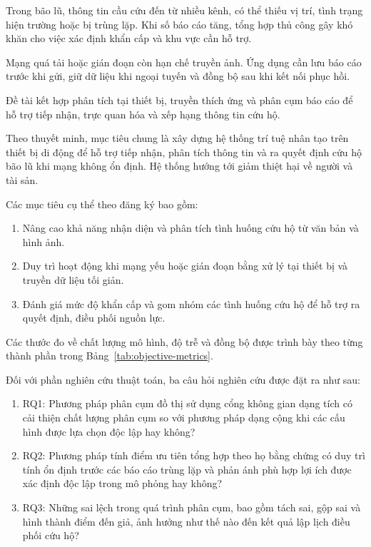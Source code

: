 
Trong bão lũ, thông tin cầu cứu đến từ nhiều kênh, có thể thiếu vị trí, tình trạng hiện trường hoặc bị trùng lặp. Khi số báo cáo tăng, tổng hợp thủ công gây khó khăn cho việc xác định khẩn cấp và khu vực cần hỗ trợ.

Mạng quá tải hoặc gián đoạn còn hạn chế truyền ảnh. Ứng dụng cần lưu báo cáo trước khi gửi, giữ dữ liệu khi ngoại tuyến và đồng bộ sau khi kết nối phục hồi.

Đề tài kết hợp phân tích tại thiết bị, truyền thích ứng và phân cụm báo cáo để hỗ trợ tiếp nhận, trực quan hóa và xếp hạng thông tin cứu hộ.



Theo thuyết minh, mục tiêu chung là xây dựng hệ thống trí tuệ nhân tạo trên thiết bị di động để hỗ trợ tiếp nhận, phân tích thông tin và ra quyết định cứu hộ bão lũ khi mạng không ổn định. Hệ thống hướng tới giảm thiệt hại về người và tài sản.

Các mục tiêu cụ thể theo đăng ký bao gồm:

\begin{enumerate}
    \item Nâng cao khả năng nhận diện và phân tích tình huống cứu hộ từ văn bản và hình ảnh.
    \item Duy trì hoạt động khi mạng yếu hoặc gián đoạn bằng xử lý tại thiết bị và truyền dữ liệu tối giản.
    \item Đánh giá mức độ khẩn cấp và gom nhóm các tình huống cứu hộ để hỗ trợ ra quyết định, điều phối nguồn lực.
\end{enumerate}

Các thước đo về chất lượng mô hình, độ trễ và đồng bộ được trình bày theo từng thành phần trong Bảng~\ref{tab:objective-metrics}.


Đối với phần nghiên cứu thuật toán, ba câu hỏi nghiên cứu được đặt ra như sau:


\begin{enumerate}
    \item RQ1: Phương pháp phân cụm đồ thị sử dụng cổng không gian dạng tích có cải thiện chất lượng phân cụm so với phương pháp dạng cộng khi các cấu hình được lựa chọn độc lập hay không?
    \item RQ2: Phương pháp tính điểm ưu tiên tổng hợp theo họ bằng chứng có duy trì tính ổn định trước các báo cáo trùng lặp và phản ánh phù hợp lợi ích được xác định độc lập trong mô phỏng hay không?
    \item RQ3: Những sai lệch trong quá trình phân cụm, bao gồm tách sai, gộp sai và hình thành điểm đến giả, ảnh hưởng như thế nào đến kết quả lập lịch điều phối cứu hộ?
\end{enumerate}


